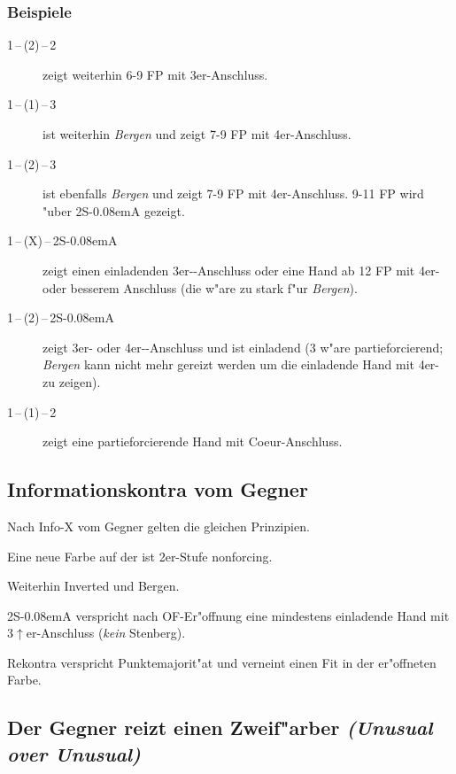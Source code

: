 \documentclass[11pt,german,twocolumn,twoside]{scrartcl}
\def\pi{\Sp\xspace}
\def\sa{\nobreak\textsf{S\kern-0.08emA}\xspace}
\def\ofa{\nobreak\textsf{OF}\xspace}
\def\pik{\nobreak\hspace{\cardskip}\Sp\xspace}
\def\coe{\nobreak\hspace{\cardskip}\He\xspace}
\def\kar{\nobreak\hspace{\cardskip}\Di\xspace}
\def\tre{\nobreak\hspace{\cardskip}\Cl\xspace}
\def\SA{\nobreak\hspace{\cardskip}\sa}
\def\pl{$\uparrow$\xspace}
\def\kontra{\textsf{X}\xspace}
\def\sep{\,--\,}
\newcommand{\conv}[1]{\emph{#1}}
\begin{document}
\subsubsection*{Beispiele}
\begin{description}
\item[1\pik{}\sep(2\kar){}\sep2\pik] zeigt weiterhin 6-9 FP mit
  3er-Anschluss.
\item[1\coe{}\sep(1\pik){}\sep3\kar] ist weiterhin \conv{Bergen} und zeigt
  7-9 FP mit 4er-Anschluss.
\item[1\coe{}\sep(2\tre){}\sep3\kar] ist ebenfalls \conv{Bergen} und zeigt
  7-9 FP mit 4er-Anschluss. 9-11 FP wird "uber 2\SA gezeigt.
\item[1\pik{}\sep(X){}\sep2\SA] zeigt einen einladenden 3er-\pi-Anschluss oder
  eine Hand ab 12 FP mit 4er- oder besserem Anschluss (die w"are
  zu stark f"ur \conv{Bergen}).
\item[1\pik{}\sep(2\kar){}\sep2\SA] zeigt 3er- oder 4er-\pi-Anschluss und
  ist einladend (3\kar w"are partieforcierend; \conv{Bergen} kann
  nicht mehr gereizt werden um die einladende Hand mit 4er-\pi{}
  zu zeigen).
\item[1\coe{}\sep(1\pik){}\sep2\pik] zeigt eine partieforcierende Hand mit
  Coeur-Anschluss.
\end{description}

\subsection{Informationskontra vom Gegner}

Nach Info-\kontra vom Gegner gelten die gleichen Prinzipien.
\begin{compactitem}
\item Eine neue Farbe auf der ist 2er-Stufe nonforcing.
\item Weiterhin Inverted und Bergen.
\item 2\SA verspricht nach \ofa-Er"offnung eine mindestens einladende Hand mit
  3\pl{}er-Anschluss (\emph{kein} Stenberg).
\item Rekontra verspricht Punktemajorit"at und verneint einen Fit in der
  er"offneten Farbe.
\end{compactitem}

\subsection{Der Gegner reizt einen Zweif"arber \conv{(Unusual over
    Unusual)}}
\end{document}
